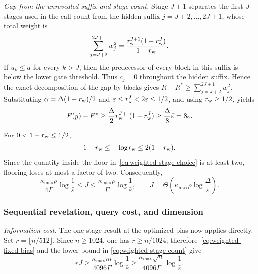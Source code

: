 \documentclass{article}
\theoremstyle{definition}
\begin{document}
\emph{Gap from the unrevealed suffix and stage count.}
Stage $J+1$ separates the first $J$ stages used in the call count from the
hidden suffix $j=J+2,\ldots,2J+1$, whose total weight is
\begin{equation}
 \sum_{j=J+2}^{2J+1}w_j^2
 =\frac{r_{\rm w}^{J+1}(1-r_{\rm w}^J)}{1-r_{\rm w}}.
 \label{eq:terminal-suffix-weight}
\end{equation}
If $u_k\le a$ for every $k>J$, then the predecessor of every block in this
suffix is below the lower gate threshold.  Thus $c_j=0$ throughout the hidden
suffix.  Hence the exact decomposition of the gap by blocks gives
$R-R^*\ge\sum_{j=J+2}^{2J+1}w_j^2$.  Substituting
$\alpha=\Delta(1-r_{\rm w})/2$ and
$\bar\varepsilon\le r_{\rm w}^J<2\bar\varepsilon\le1/2$, and using
$r_{\rm w}\ge1/2$, yields
\begin{equation}
 F(y)-F^*
 \ge\frac{\Delta}{2}r_{\rm w}^{J+1}(1-r_{\rm w}^J)
 \ge\frac{\Delta}{8}\bar\varepsilon
 =8\varepsilon.
 \label{eq:terminal-suffix-residual-scale}
\end{equation}

For $0<1-r_{\rm w}\le1/2$,
\begin{equation}
 1-r_{\rm w}\le-\log r_{\rm w}\le2(1-r_{\rm w}).
\end{equation}
Since the quantity inside the floor in~\eqref{eq:weighted-stage-choice} is at
least two, flooring loses at most a factor of two.  Consequently,
\begin{equation}
 \frac{\kappa_{\max}\rho}{4\Gamma}\log\frac1{\bar\varepsilon}
 \le J
 \le\frac{\kappa_{\max}\rho}{\Gamma}\log\frac1{\bar\varepsilon},
 \qquad
 J=\Theta\!\left(
 \kappa_{\max}\rho\log\frac{\Delta}{\varepsilon}
 \right).
 \label{eq:weighted-stage-count}
\end{equation}

\subsubsection{Sequential revelation, query cost, and dimension}

\emph{Information cost.}
The one-stage result at the optimized bias now applies directly.  Set
$r=\lfloor n/512\rfloor$.  Since $n\ge1024$, one has $r\ge n/1024$;
therefore~\eqref{eq:weighted-fixed-bias} and the lower bound in
\eqref{eq:weighted-stage-count} give
\begin{equation}
 rJ
 \ge\frac{\kappa_{\max}m}{4096\Gamma}\log\frac1{\bar\varepsilon}
 \ge\frac{\kappa_{\max}\sqrt n}{4096\Gamma}\log\frac1{\bar\varepsilon}.
 \label{eq:weighted-row-cost}
\end{equation}
\end{document}
